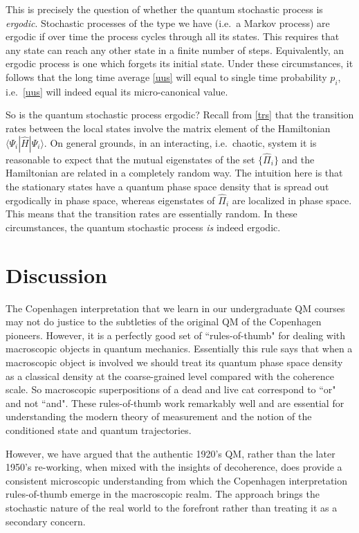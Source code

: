 \documentclass[12pt]{article}
\theoremstyle{plain}
\theoremstyle{definition}
\theoremstyle{remark}
\def\bra#1{\langle #1|}
\def\ket#1{| #1\rangle}
\begin{document}
This is precisely the question of whether the quantum stochastic process is {\it ergodic\/}. Stochastic processes of the type we have (i.e.~a Markov process) are ergodic if over time the process cycles through all its states. This requires that any state can reach any other state in a finite number of steps. Equivalently, an ergodic process is one which forgets its initial state. Under these circumstances, it follows that the long time average \eqref{uus} will equal to single time probability $p_i$, i.e.~\eqref{uus} will indeed equal its micro-canonical value.

So is the quantum stochastic process ergodic? Recall from \eqref{trs} that the transition rates between the local states involve the matrix element of the Hamiltonian $\bra{\Psi_i}\hat H\ket{\Psi_i}$. On general grounds, in an interacting, i.e.~chaotic, system it is reasonable to expect that the mutual eigenstates of the set $\{\hat\Pi_i\}$ and the Hamiltonian are related in a completely random way. The intuition here is that the stationary states have a quantum phase space density that is spread out ergodically in phase space, whereas eigenstates of $\hat\Pi_i$ are localized in phase space. This means that the transition rates are essentially random. In these circumstances, the quantum stochastic process {\it is\/} indeed ergodic.

\section{Discussion}\label{s9}

The Copenhagen interpretation that we learn in our undergraduate QM courses may not do justice to the subtleties of the original QM of the Copenhagen pioneers. However, it is a perfectly good set of ``rules-of-thumb" for dealing with macroscopic objects in quantum mechanics. Essentially this rule says that when a macroscopic object is involved we should treat its quantum phase space density as a classical density at the coarse-grained level compared with the coherence scale. So macroscopic superpositions of a dead and live cat correspond to ``or" and not ``and". These rules-of-thumb work remarkably  well and are essential for understanding the modern theory of measurement and the notion of the conditioned state and quantum trajectories. 

However, we have argued that the authentic 1920's QM, rather than the later 1950's re-working, when mixed with the insights of decoherence, does provide a consistent microscopic understanding from which the Copenhagen interpretation rules-of-thumb emerge in the macroscopic realm. The approach brings the stochastic nature of the real world to the forefront rather than treating it as a secondary concern.
\end{document}
